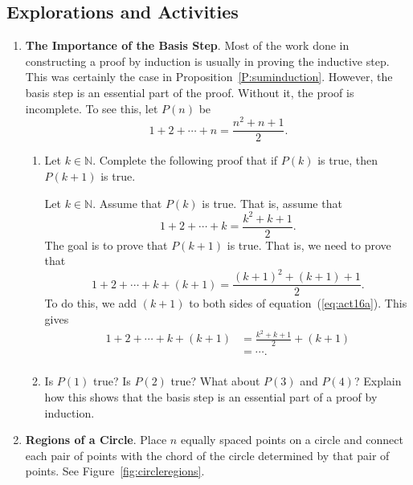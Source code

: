\subsection*{Explorations and Activities}
\setcounter{oldenumi}{\theenumi}
\begin{enumerate} \setcounter{enumi}{\theoldenumi} \setcounter{equation}{0}
  \item \textbf{The Importance of the Basis Step}.  \label{exer:basis} Most of the work done in constructing a proof by induction is usually in proving the inductive step.  This was certainly the case in Proposition~\ref{P:suminduction}.  However, the basis step is an essential part of the proof. Without it, the proof is incomplete.  To see this, let 
$P( n )$   be 
\[
1 + 2 +  \cdots  + n = \frac{{n^2  + n + 1}}{2}.
\]
\begin{enumerate}
  \item Let  $k \in \mathbb{N}$.  Complete the following proof that if  $P(  k )$ is true, then  $P( k + 1 )$ is true.

Let  $k \in \mathbb{N}$.  Assume that  $P(  k )$ is true.  That is, assume that
%
\begin{equation} \label{eq:act16a}
1 + 2 +  \cdots  + k = \frac{{k^2  + k + 1}}{2}.
\end{equation}
%
The goal is to prove that  $P( k + 1 )$ is true.  That is, we need to prove that
%
\begin{equation} \label{eq:act16b}
1 + 2 +  \cdots  + k + \left( {k + 1} \right) = \frac{{\left( {k + 1} \right)^2  + \left( {k + 1} \right) + 1}}{2}.
\end{equation}
%
To do this, we add  $\left( {k + 1} \right)$ to both sides of equation~(\ref{eq:act16a}).  This gives
\[
\begin{aligned}
  1 + 2 +  \cdots  + k + \left( {k + 1} \right) &= \frac{{k^2  + k + 1}}{2} + \left( {k + 1} \right) \\ 
                                                &=  \cdots.  \\ 
\end{aligned}
\]

  \item Is  $P( 1 )$ true?  Is  $P( 2 )$ true?  What about $P( 3 )$ and $P( 4 )$?  Explain how this shows that the basis step is an essential part of a proof by induction.
\end{enumerate}

\item \textbf{Regions of a Circle}. \label{exer:circleregions} Place  $n$  equally spaced points on a circle and connect each pair of points with the chord of the circle determined by that pair of points.  See Figure~\ref{fig:circleregions}.


\end{enumerate}
